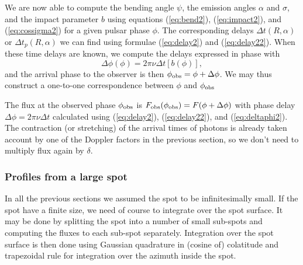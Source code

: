 \documentclass{wihuri}
\def\be{\begin{equation}}
\def\ee{\end{equation}}
\def\phiobs{\phi_{\rm obs}}
\begin{document}
We are now able to compute the bending angle $\psi$, the emission angles $\alpha$ and $\sigma$, and the impact parameter $b$ using equations (\ref{eq:bend2}), (\ref{eq:impact2}), and (\ref{eq:cossigma2}) for a given pulsar phase $\phi$. The corresponding delays $\Delta t(R,\alpha)$ or $\Delta t_{p}(R,\alpha)$ we can find using formulae (\ref{eq:delay2}) and (\ref{eq:delay22}). When these time delays are known, we compute the delays expressed in phase with 
\be \label{eq:deltaphi2}
\Delta \phi(\phi) =2\pi\nu \Delta t[b(\phi)],
\ee
and the arrival phase to the observer is then $\phiobs=\phi+ \Delta\phi$. We may thus construct a one-to-one correspondence between $\phi$ and $\phiobs$

The flux at the observed phase $\phiobs$ is
${F}_{\rm obs}(\phiobs)=F(\phi+\Delta\phi)$ with
phase delay  $\Delta \phi=2\pi\nu\Delta t$
calculated using (\ref{eq:delay2}), (\ref{eq:delay22}), and (\ref{eq:deltaphi2}).
The contraction (or stretching) of the arrival times of photons is already taken account by one of the Doppler factors in the previous section, so we don't need to multiply flux again by $\delta$. 




\subsubsection{Profiles from a large spot} 

In all the previous sections we assumed the spot to be infinitesimally small. If the spot have a finite size, we need of course to integrate over the spot surface. It may be done by splitting the spot into a number of small sub-spots and computing the fluxes to each sub-spot separately. Integration over the spot surface is then done using Gaussian quadrature in (cosine of) colatitude and trapezoidal rule for integration over the azimuth inside the spot. 
\end{document}
